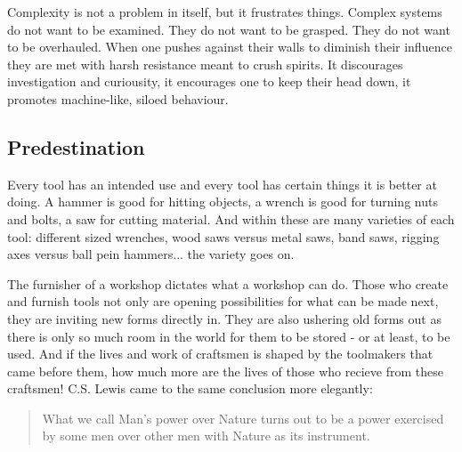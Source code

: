 \documentclass[letterpaper]{article}
\begin{document}
\iffalse
I do not mean to write about the legality of these practices or political rammifications- much has been written about this already. Complexity can take many forms from mere incompatibility to the predatory practice of 'embrace, extend, extinguish'. This latter practice allows for an outward appearance of reducing complexity with an end result that makes the entire landscape complex and harsh. To make things simple rather than complex is not a mere legal rule to be followed, it is a spirit that must be embraced.
\fi

Complexity is not a problem in itself, but it frustrates things. Complex systems do not want to be examined. They do not want to be grasped. They do not want to be overhauled. When one pushes against their walls to diminish their influence they are met with harsh resistance meant to crush spirits. It discourages investigation and curiousity, it encourages one to keep their head down, it promotes machine-like, siloed behaviour.

\subsection{Predestination}

Every tool has an intended use and every tool has certain things it is better at doing. A hammer is good for hitting objects, a wrench is good for turning nuts and bolts, a saw for cutting material. And within these are many varieties of each tool: different sized wrenches, wood saws versus metal saws, band saws, rigging axes versus ball pein hammers... the variety goes on.

The furnisher of a workshop dictates what a workshop can do. Those who create and furnish tools not only are opening possibilities for what can be made next, they are inviting new forms directly in. They are also ushering old forms out as there is only so much room in the world for them to be stored - or at least, to be used. And if the lives and work of craftsmen is shaped by the toolmakers that came before them, how much more are the lives of those who recieve from these craftsmen! C.S. Lewis came to the same conclusion more elegantly:

\begin{quote}
  What we call Man's power over Nature turns out to be a power exercised by some men over other men with Nature as its instrument.
\end{quote}
\end{document}
